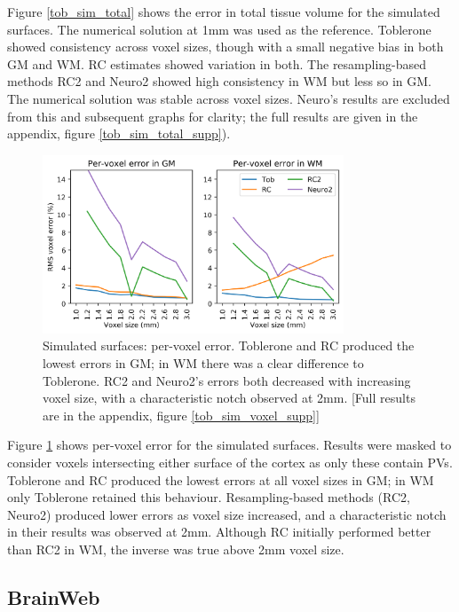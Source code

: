\documentclass[12pt]{report}
\providecommand{\DIFaddtex}[1]{{\protect\color{blue}\uwave{#1}}} %
\providecommand{\DIFaddbegin}{} %
\providecommand{\DIFaddend}{} %
\providecommand{\DIFadd}[1]{\texorpdfstring{\DIFaddtex{#1}}{#1}} %
\newcommand{\DIFaddincludegraphics}[2][]{{\color{blue}\fbox{\DIFOincludegraphics[#1]{#2}}}} %
\DeclareRobustCommand{\DIFaddbegin}{\DIFOaddbegin \let\includegraphics\DIFaddincludegraphics} %
\DeclareRobustCommand{\DIFaddend}{\DIFOaddend \let\includegraphics\DIFOincludegraphics} %
\begin{document}
Figure \ref{tob_sim_total} shows the error in total tissue volume \DIFaddbegin \DIFadd{across all voxels }\DIFaddend for the simulated surfaces. The numerical solution at 1mm was used as the reference. Toblerone showed consistency across voxel sizes, though with a small negative bias in both GM and WM. RC estimates showed variation in both. The resampling-based methods RC2 and Neuro2 showed high consistency in WM but less so in GM. The numerical solution was stable across voxel sizes. Neuro’s results are excluded from this and subsequent graphs for clarity; the full results are given in the appendix, figure \ref{tob_sim_total_supp}). 

\begin{figure}[H]
\centering
\includegraphics[width = 0.8\textwidth]{tob_sim_voxel.png}
\caption{Simulated surfaces: per-voxel error. Toblerone and RC produced the lowest errors in GM; in WM there was a clear difference to Toblerone. RC2 and Neuro2’s errors both decreased with increasing voxel size, with a characteristic notch observed at 2mm. [Full results are in the appendix, figure \ref{tob_sim_voxel_supp}]}
\label{tob_sim_voxel}
\end{figure}

Figure \ref{tob_sim_voxel} shows per-voxel error for the simulated surfaces. Results were masked to consider voxels intersecting either surface of the cortex as only these contain PVs. Toblerone and RC produced the lowest errors at all voxel sizes in GM; in WM only Toblerone retained this behaviour. Resampling-based methods (RC2, Neuro2) produced lower errors as voxel size increased, and a characteristic notch in their results was observed at 2mm. Although RC initially performed better than RC2 in WM, the inverse was true above 2mm voxel size.

\subsection{BrainWeb}
\end{document}
